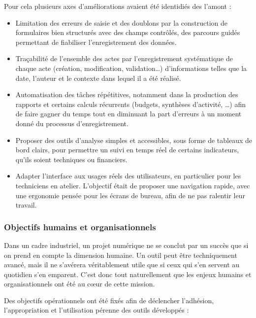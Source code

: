 \documentclass[11pt,a4paper]{article}
\begin{document}
Pour cela plusieurs axes d'améliorations avaient été identidiés des l'amont :

\begin{itemize}
    \item Limitation des erreurs de saisie et des doublons par la construction de formulaires bien structurés avec des champs contrôlés, des parcours guidés permettant de fiabiliser l’enregistrement des données.
    
    \item Traçabilité de l’ensemble des actes par l’enregistrement systématique de chaque acte (création, modification, validation…) d’informations telles que la date, l’auteur et le contexte dans lequel il a été réalisé.
    
    \item Automatisation des tâches répétitives, notamment dans la production des rapports et certains calculs récurrents (budgets, synthèses d’activité, …) afin de faire gagner du temps tout en diminuant la part d’erreurs à un moment donné du processus d’enregistrement.
    
    \item Proposer des outils d'analyse simples et accessibles, sous forme de tableaux de bord clairs, pour permettre un suivi en temps réel de certains indicateurs, qu'ils soient techniques ou financiers.
	\item Adapter l'interface aux usages réels des utilisateurs, en particulier pour les techniciens en atelier. L'objectif était de proposer une navigation rapide, avec une ergonomie pensée pour les écrans de bureau, afin de ne pas ralentir leur travail.    
        
\end{itemize}

\subsubsection{Objectifs humains et organisationnels}

Dans un cadre industriel, un projet numérique ne se conclut par un succès que si on prend en compte la dimension humaine. Un outil peut être techniquement avancé, mais il ne s’avérera véritablement utile que si ceux qui s’en servent au quotidien s’en emparent. C’est donc tout naturellement que les enjeux humains et organisationnels ont été au cœur de cette mission.

Des objectifs opérationnels ont été fixés afin de déclencher l’adhésion, l’appropriation et l’utilisation pérenne des outils développés :
\end{document}
